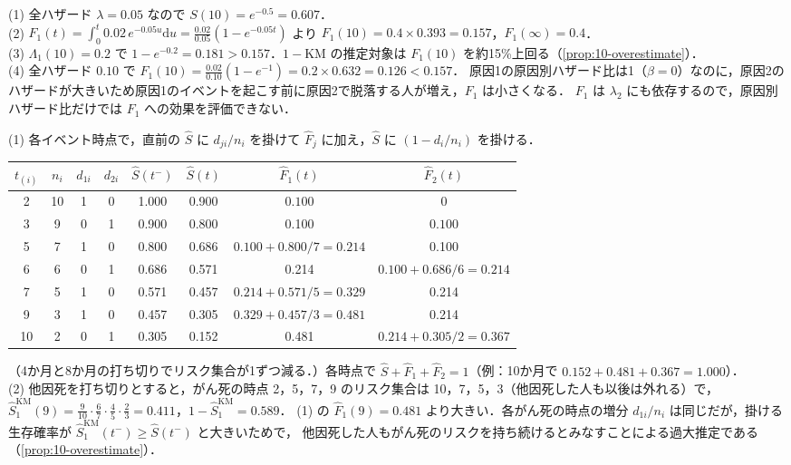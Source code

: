 \documentclass[a4paper,11pt,openany]{ltjsbook}
\newenvironment{kaitou}[1]{%
  \par\medskip\noindent
  \begin{tcolorbox}[enhanced,breakable,colback=bkgray!3,colframe=bkgray!60,boxrule=0.4pt,
    left=4pt,right=4pt,top=2pt,bottom=2pt,arc=1pt,
    title={\cref{#1}の解答},fonttitle=\bfseries\small,coltitle=white,colbacktitle=bkgray!80]}%
  {\end{tcolorbox}\par}
\newcommand{\dd}{\mathrm{d}}
\begin{document}
\begin{kaitou}{reidai:10-4}
(1) 全ハザード $\lambda=0.05$ なので $S(10)=e^{-0.5}=0.607$．\\
(2) $F_1(t)=\int_0^t0.02\,e^{-0.05u}\dd u=\frac{0.02}{0.05}(1-e^{-0.05t})$ より $F_1(10)=0.4\times0.393=0.157$，$F_1(\infty)=0.4$．\\
(3) $\Lambda_1(10)=0.2$ で $1-e^{-0.2}=0.181>0.157$．$1-\mathrm{KM}$ の推定対象は $F_1(10)$ を約15\%上回る（\cref{prop:10-overestimate}）．\\
(4) 全ハザード $0.10$ で $F_1(10)=\frac{0.02}{0.10}(1-e^{-1})=0.2\times0.632=0.126<0.157$．
原因1の原因別ハザード比は1（$\beta=0$）なのに，原因2のハザードが大きいため原因1のイベントを起こす前に原因2で脱落する人が増え，$F_1$ は小さくなる．
$F_1$ は $\lambda_2$ にも依存するので，原因別ハザード比だけでは $F_1$ への効果を評価できない．
\end{kaitou}

\begin{kaitou}{reidai:10-5}
(1) 各イベント時点で，直前の $\hat S$ に $d_{ji}/n_i$ を掛けて $\hat F_j$ に加え，$\hat S$ に $(1-d_i/n_i)$ を掛ける．
\begin{center}\small
\begin{tabular}{@{}cccccccc@{}}
\toprule
$t_{(i)}$ & $n_i$ & $d_{1i}$ & $d_{2i}$ & $\hat S(t^-)$ & $\hat S(t)$ & $\hat F_1(t)$ & $\hat F_2(t)$\\
\midrule
2 & 10 & 1 & 0 & 1.000 & 0.900 & $0.100$ & 0\\
3 & 9 & 0 & 1 & 0.900 & 0.800 & 0.100 & $0.100$\\
5 & 7 & 1 & 0 & 0.800 & 0.686 & $0.100+0.800/7=0.214$ & 0.100\\
6 & 6 & 0 & 1 & 0.686 & 0.571 & 0.214 & $0.100+0.686/6=0.214$\\
7 & 5 & 1 & 0 & 0.571 & 0.457 & $0.214+0.571/5=0.329$ & 0.214\\
9 & 3 & 1 & 0 & 0.457 & 0.305 & $0.329+0.457/3=0.481$ & 0.214\\
10 & 2 & 0 & 1 & 0.305 & 0.152 & 0.481 & $0.214+0.305/2=0.367$\\
\bottomrule
\end{tabular}
\end{center}
（4か月と8か月の打ち切りでリスク集合が1ずつ減る．）各時点で $\hat S+\hat F_1+\hat F_2=1$（例：10か月で $0.152+0.481+0.367=1.000$）．\\
(2) 他因死を打ち切りとすると，がん死の時点 2，5，7，9 のリスク集合は 10，7，5，3（他因死した人も以後は外れる）で，
$\hat S_1^{\mathrm{KM}}(9)=\frac9{10}\cdot\frac67\cdot\frac45\cdot\frac23=0.411$，$1-\hat S_1^{\mathrm{KM}}=0.589$．
(1) の $\hat F_1(9)=0.481$ より大きい．各がん死の時点の増分 $d_{1i}/n_i$ は同じだが，掛ける生存確率が $\hat S_1^{\mathrm{KM}}(t^-)\ge\hat S(t^-)$ と大きいためで，
他因死した人もがん死のリスクを持ち続けるとみなすことによる過大推定である（\cref{prop:10-overestimate}）．
\end{kaitou}
\end{document}
